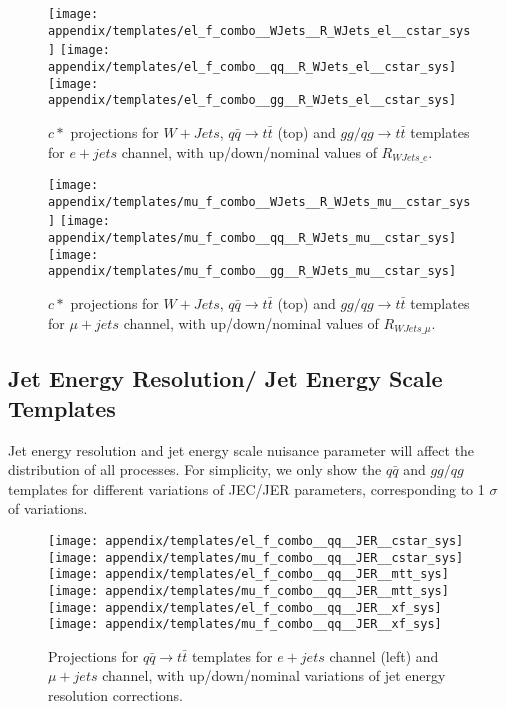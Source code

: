 \documentclass{cmspaperpdf}
\begin{document}
\begin{figure}[hbt]
  \begin{center}
    \texttt{[image: appendix/templates/el\_f\_combo\_\_WJets\_\_R\_WJets\_el\_\_cstar\_sys]}
    \texttt{[image: appendix/templates/el\_f\_combo\_\_qq\_\_R\_WJets\_el\_\_cstar\_sys]}
    \texttt{[image: appendix/templates/el\_f\_combo\_\_gg\_\_R\_WJets\_el\_\_cstar\_sys]}
  \caption{\small $c*$ projections for $W+Jets$,  $q\bar q \rightarrow t\bar t$ (top) and $gg/qg \rightarrow t\bar t$ templates for $e+jets$ channel, with up/down/nominal values of $R_{WJets\_e}$.}
  \label{appendix:R_WJets temp e+jets}
  \end{center}
\end{figure}

\begin{figure}[hbt]
  \begin{center}
    \texttt{[image: appendix/templates/mu\_f\_combo\_\_WJets\_\_R\_WJets\_mu\_\_cstar\_sys]}
    \texttt{[image: appendix/templates/mu\_f\_combo\_\_qq\_\_R\_WJets\_mu\_\_cstar\_sys]}
    \texttt{[image: appendix/templates/mu\_f\_combo\_\_gg\_\_R\_WJets\_mu\_\_cstar\_sys]}
  \caption{\small $c*$ projections for $W+Jets$,  $q\bar q \rightarrow t\bar t$ (top) and $gg/qg \rightarrow t\bar t$ templates for $\mu+jets$ channel, with up/down/nominal values of $R_{WJets\_\mu}$.}
  \label{appendix:R_WJets temp mu+jets}
  \end{center}
\end{figure}

\subsection{Jet Energy Resolution/ Jet Energy Scale Templates}
Jet energy resolution and jet energy scale nuisance parameter will affect the distribution of all processes. For simplicity, we only show the $q\bar q$ and $gg/qg$ templates for different variations of JEC/JER parameters, corresponding to 1 $\sigma$ of variations.

\begin{figure}[hbt]
  \begin{center}
    \texttt{[image: appendix/templates/el\_f\_combo\_\_qq\_\_JER\_\_cstar\_sys]}
    \texttt{[image: appendix/templates/mu\_f\_combo\_\_qq\_\_JER\_\_cstar\_sys]}    
    \texttt{[image: appendix/templates/el\_f\_combo\_\_qq\_\_JER\_\_mtt\_sys]}
    \texttt{[image: appendix/templates/mu\_f\_combo\_\_qq\_\_JER\_\_mtt\_sys]}
    \texttt{[image: appendix/templates/el\_f\_combo\_\_qq\_\_JER\_\_xf\_sys]}
    \texttt{[image: appendix/templates/mu\_f\_combo\_\_qq\_\_JER\_\_xf\_sys]}
  \caption{\small Projections for $q\bar q \rightarrow t\bar t$ templates for $e+jets$ channel (left) and $\mu+jets$ channel, with up/down/nominal variations of jet energy resolution corrections.}
  \label{appendix:JER qq temp}
  \end{center}
\end{figure}
\end{document}
